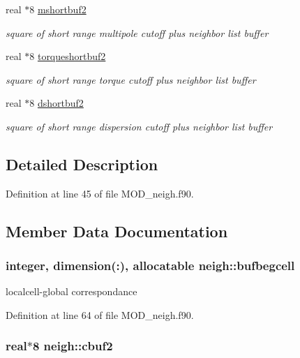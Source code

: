 \begin{DoxyCompactItemize}
real $\ast$8 \hyperlink{classneigh_a8dca5facfaf57e4868e61d23956eafed}{mshortbuf2}
\begin{DoxyCompactList}\small\item\em square of short range multipole cutoff plus neighbor list buffer \end{DoxyCompactList}\item 
real $\ast$8 \hyperlink{classneigh_abc30fecff32f4c08aa624fe00db9f4bb}{torqueshortbuf2}
\begin{DoxyCompactList}\small\item\em square of short range torque cutoff plus neighbor list buffer \end{DoxyCompactList}\item 
real $\ast$8 \hyperlink{classneigh_a1fda85cc92ca9462671291bce775e41b}{dshortbuf2}
\begin{DoxyCompactList}\small\item\em square of short range dispersion cutoff plus neighbor list buffer \end{DoxyCompactList}\end{DoxyCompactItemize}


\subsection{Detailed Description}


Definition at line 45 of file M\-O\-D\-\_\-neigh.\-f90.



\subsection{Member Data Documentation}
\hypertarget{classneigh_ad81f20d0ff46ad1b2ec20f56da6928f7}{
\subsubsection[{bufbegcell}]{\setlength{\rightskip}{0pt plus 5cm}integer, dimension(\-:), allocatable neigh\-::bufbegcell}}\label{classneigh_ad81f20d0ff46ad1b2ec20f56da6928f7}


localcell-\/global correspondance 



Definition at line 64 of file M\-O\-D\-\_\-neigh.\-f90.

\hypertarget{classneigh_a510e225bf421ef9c1de15bece3739532}{
\subsubsection[{cbuf2}]{\setlength{\rightskip}{0pt plus 5cm}real$\ast$8 neigh\-::cbuf2}}\label{classneigh_a510e225bf421ef9c1de15bece3739532}


